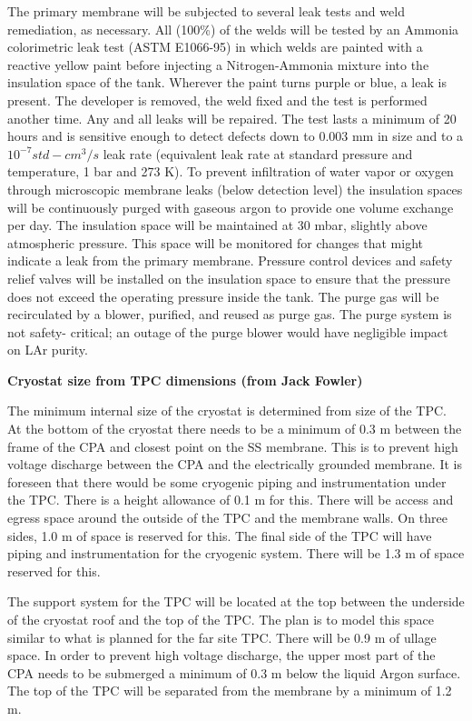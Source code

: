 The primary membrane will be subjected to several leak tests and weld remediation, as necessary. All 
(100\%) of the welds will be tested by an Ammonia colorimetric leak test (ASTM E1066-95) in which 
welds are painted with a reactive yellow paint before injecting a Nitrogen-Ammonia mixture into the 
insulation space of the tank. Wherever the paint turns purple or blue, a leak is present. The developer is 
removed, the weld fixed and the test is performed another time. Any and all leaks will be repaired. The 
test lasts a minimum of 20 hours and is sensitive enough to detect defects down to 0.003 mm in size 
and to a $10^{-7} std-cm^3/s$ leak rate (equivalent leak rate at standard pressure and temperature, 1 bar and 
273 K). To prevent infiltration of water vapor or oxygen through microscopic membrane leaks (below 
detection level) the insulation spaces will be continuously purged with gaseous argon to provide one 
volume exchange per day. The insulation space will be maintained at 30 mbar, slightly above 
atmospheric pressure. This space will be monitored for changes that might indicate a leak from the 
primary membrane. Pressure control devices and safety relief valves will be installed on the insulation 
space to ensure that the pressure does not exceed the operating pressure inside the tank. The purge gas 
will be recirculated by a blower, purified, and reused as purge gas. The purge system is not safety-
critical; an outage of the purge blower would have negligible impact on LAr purity.

\textbf{Cryostat size from TPC dimensions  (from Jack Fowler)}

The minimum internal size of the cryostat is determined from size of the TPC.  At the bottom of the 
cryostat there needs to be a minimum of 0.3 m between the frame of the CPA and closest point on the SS 
membrane.  This is to prevent high voltage discharge between the CPA and the electrically grounded 
membrane. It is foreseen that there would be some cryogenic piping and instrumentation under the TPC.  
There is a height allowance of 0.1 m for this.  There will be access and egress space around the outside 
of the TPC and the membrane walls.  On three sides, 1.0 m of space is reserved for this.  The final side of 
the TPC will have piping and instrumentation for the cryogenic system.  There will be 1.3 m of space 
reserved for this.  

The support system for the TPC will be located at the top between the underside of the cryostat roof and 
the top of the TPC.  The plan is to model this space similar to what is planned for the far site TPC.  There 
will be 0.9 m of ullage space.  In order to prevent high voltage discharge, the upper most part of the CPA 
needs to be submerged a minimum of 0.3 m below the liquid Argon surface.  The top of the TPC will be 
separated from the membrane by a minimum of 1.2 m.  


